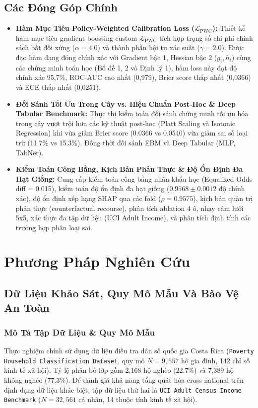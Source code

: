 \documentclass[conference]{IEEEtran}
\begin{document}
\subsection{Các Đóng Góp Chính}
\begin{itemize}
\item \textbf{Hàm Mục Tiêu Policy-Weighted Calibration Loss ($\mathcal{L}_{\text{PWC}}$):} Thiết kế hàm mục tiêu gradient boosting custom $\mathcal{L}_{\text{PWC}}$ tích hợp trọng số chi phí chính sách bất đối xứng ($\alpha=4.0$) và thành phần hội tụ xác suất ($\gamma=2.0$). Được đạo hàm dạng đóng chính xác với Gradient bậc 1, Hessian bậc 2 ($g_i, h_i$) cùng các chứng minh toán học (Bổ đề 1, 2 và Định lý 1), hàm loss này đạt độ chính xác 95,7\%, ROC-AUC cao nhất (0,979), Brier score thấp nhất (0,0366) và ECE thấp nhất (0,0251).
\item \textbf{Đối Sánh Tối Ưu Trong Cây vs. Hiệu Chuẩn Post-Hoc & Deep Tabular Benchmark:} Thực thi kiểm toán đối sánh chứng minh tối ưu hóa trong cây vượt trội hơn các kỹ thuật post-hoc (Platt Scaling và Isotonic Regression) khi vừa giảm Brier score (0.0366 vs 0.0540) vừa giảm sai số loại trừ (11.7\% vs 15.3\%). Đồng thời đối sánh EBM và Deep Tabular (MLP, TabNet).
\item \textbf{Kiểm Toán Công Bằng, Kịch Bản Phản Thực & Độ Ổn Định Đa Hạt Giống:} Cung cấp kiểm toán công bằng nhân khẩu học (Equalized Odds diff = 0.015), kiểm toán độ ổn định đa hạt giống ($0.9568 \pm 0.0012$ độ chính xác), độ ổn định xếp hạng SHAP qua các fold ($\rho = 0.9575$), kịch bản quản trị phản thực (counterfactual recourse), phân tích ablation 4 ô, nhạy cảm lưới 5x5, xác thực đa tập dữ liệu (UCI Adult Income), và phân tích định tính các trường hợp phân loại sai.
\end{itemize}

\section{Phương Pháp Nghiên Cứu}

\subsection{Dữ Liệu Khảo Sát, Quy Mô Mẫu Và Bảo Vệ An Toàn}

\subsubsection{Mô Tả Tập Dữ Liệu & Quy Mô Mẫu}
Thực nghiệm chính sử dụng dữ liệu điều tra dân số quốc gia Costa Rica (\texttt{Poverty Household Classification Dataset}, quy mô $N=9,557$ hộ gia đình, 142 chỉ số kinh tế xã hội). Tỷ lệ phân bố lớp gồm 2,168 hộ nghèo ($22.7\%$) và 7,389 hộ không nghèo ($77.3\%$). Để đánh giá khả năng tổng quát hóa cross-national trên định dạng dữ liệu khác biệt, tập dữ liệu thứ hai là \texttt{UCI Adult Census Income Benchmark} ($N=32,561$ cá nhân, 14 thuộc tính kinh tế xã hội).
\end{document}
